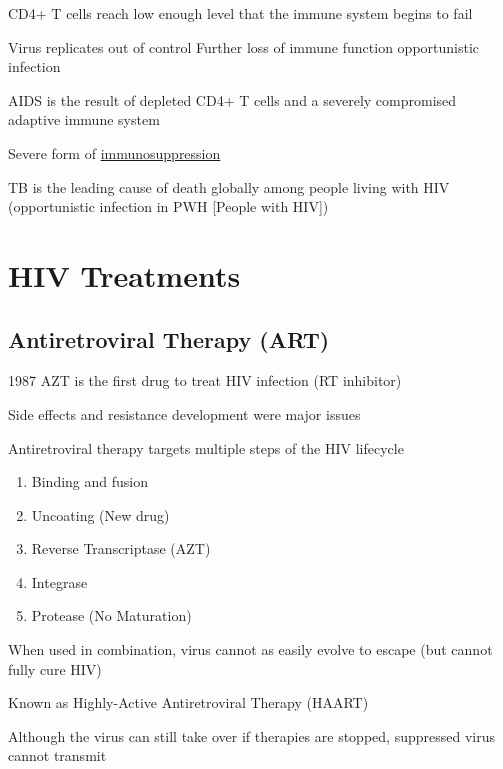 \documentclass{notes}
\begin{document}
\tab CD4+ T cells reach low enough level that the immune system begins to fail

\tab Virus replicates out of control \indicates Further loss of immune function \indicates opportunistic infection


AIDS is the result of depleted CD4+ T cells and a severely compromised adaptive immune system

\indicates Severe form of \underline{immunosuppression}

\tab \indicates TB is the leading cause of death globally among people living with HIV (opportunistic infection in PWH [People with HIV])

\section{HIV Treatments}

\subsection{Antiretroviral Therapy (ART)}

1987 AZT is the first drug to treat HIV infection (RT inhibitor)

\tab Side effects and resistance development were major issues

Antiretroviral therapy targets multiple steps of the HIV lifecycle

\begin{enumerate}
    \item Binding and fusion
    \item Uncoating (New drug)
    \item Reverse Transcriptase (AZT)
    \item Integrase
    \item Protease (No Maturation)
\end{enumerate}

When used in combination, virus cannot as easily evolve to escape (but cannot fully cure HIV)

\tab Known as Highly-Active Antiretroviral Therapy (HAART)


Although the virus can still take over if therapies are stopped, suppressed virus cannot transmit
\end{document}
